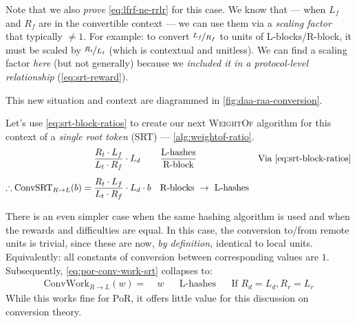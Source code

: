 Note that we also \emph{prove} \autoref{eq:lfrf-ne-rrlr} for this case.
We know that --- when $L_f$ and $R_f$ are in the convertible context --- we can use them via a \emph{scaling factor} that typically $\ne 1$. For example: to convert $\nicefrac{L_f}{R_f}$ to units of L-blocks/R-block, it must be scaled by $\nicefrac{R_t}{L_t}$ (which is contextual and unitless).
We can find a scaling factor \emph{here} (but not generally) because we \emph{included it in a protocol-level relationship} (\autoref{eq:srt-reward}).

This new situation and context are diagrammed in \autoref{fig:daa-raa-conversion}.

Let's use \autoref{eq:srt-block-ratios} to create our next \textsc{WeightOf} algorithm for this context of a \emph{single root token} (SRT) --- \autoref{alg:weightof-ratio}.
\begin{align}
    & \; \frac{R_t \cdot L_f}{L_t \cdot R_f} \cdot L_d
        & & \frac{\text{L-hashes}}{\text{R-block}}
        & & \text{Via \autoref{eq:srt-block-ratios}}
        \nonumber
        \\[0.5em]
    \therefore \text{ConvSRT}_{R\rightarrow L}(b) = & \; \frac{R_t \cdot L_f}{L_t \cdot R_f} \cdot L_d \cdot b
        & & \text{R-blocks } \rightarrow \text{ L-hashes}
        & &
        \label{eq:conv-srt}
\end{align}



There is an even simpler case when the same hashing algorithm is used and when the rewards and difficulties are equal.
In this case, the conversion to/from remote units is trivial, since these are now, \emph{by definition,} identical to local units.
Equivalently: all constants of conversion between corresponding values are $1$.
Subsequently, \autoref{eq:por-conv-work-srt} collapses to:
\begin{align}
    \text{ConvWork}_{R\rightarrow L}(w) = \; & w
        & & \text{L-hashes}
        & & \text{If } R_d = L_d, R_r = L_r
        \label{eq:por-conv-work-degenerate}
\end{align}
While this works fine for PoR, it offers little value for this discussion on conversion theory.
